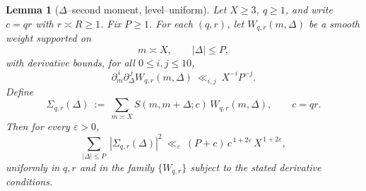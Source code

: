 \documentclass[11pt]{article}
\newtheorem{lemma}{Lemma}[part]
\theoremstyle{definition}
\theoremstyle{remark}
\numberwithin{equation}{part}
\begin{document}
\begin{lemma}[{\boldmath $\Delta$--second moment, level--uniform}]
	\label{lem:delta-second-moment-fullyrigid}
	Let $X\ge 3$, $q\ge 1$, and write $c=qr$ with $r\asymp R\ge 1$.
	Fix $P\ge 1$. For each $(q,r)$, let $W_{q,r}(m,\Delta)$ be a smooth weight supported on
	\[
		m\asymp X,\qquad |\Delta|\le P,
	\]
	with derivative bounds, for all $0\le i,j\le 10$,
	\[
		\partial_m^{\,i}\partial_\Delta^{\,j}W_{q,r}(m,\Delta)\ \ll_{i,j}\ X^{-i}P^{-j}.
	\]
	Define
	\[
		\Sigma_{q,r}(\Delta)\ :=\ \sum_{m\asymp X} S(m,m+\Delta;c)\,W_{q,r}(m,\Delta),
		\qquad c=qr.
	\]
	Then for every $\varepsilon>0$,
	\[
		\sum_{|\Delta|\le P}\ |\Sigma_{q,r}(\Delta)|^2
		\ \ll_{\varepsilon}\ (P+c)\,c^{\,1+2\varepsilon}\,X^{\,1+2\varepsilon},
	\]
	uniformly in $q,r$ and in the family $\{W_{q,r}\}$ subject to the stated derivative conditions.
\end{lemma}
\end{document}
